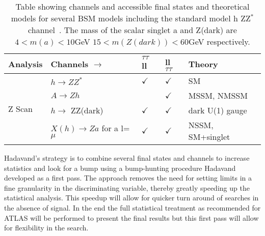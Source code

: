 \begin{table}[h]
\begin{center}
\begin{tabular}{ l |  l    |  l                   | l         || l    }  \hline 
 Analysis   & Channels        $\rightarrow$  &  $\tau \tau$ ll  & ll $\tau \tau$  &   Theory  \\ \hline \hline
\multirow{4}{*}{Z Scan} & $h\rightarrow ZZ^*$ &  $\checkmark$ & $\checkmark$                     & SM \\  

  &$A \rightarrow Zh$            &                    & $\checkmark$     &   MSSM, NMSSM \\  
  &$h \rightarrow$ ZZ(dark)  &    $ \checkmark$          & $\checkmark$  &dark U(1) gauge     \\   
  &$X(h) \rightarrow  Za$ for a l=$\mu$  &  $\checkmark$      & $\checkmark$ &   NSSM, SM+singlet\\ \hline \hline

    \hline
    \end{tabular}
    \caption{ Table showing channels and accessible final states and theoretical models for several BSM models including the standard model h \too ZZ$^*$ channel~\cite{hexotic}.  The mass of the scalar singlet a and Z(dark) are  $4  <m(a)< 10 $GeV   $15 < m(Z(dark)) < 60 $GeV respectively.}
\label{tab:anal}
\end{center}
\end{table}

Hadavand's strategy is to combine several final states and channels to increase statistics and look for a bump using a bump-hunting procedure Hadavand developed as a first pass. 
The approach removes the need for setting limits in a fine granularity in the discriminating variable, thereby greatly speeding up the statistical analysis. 
This speedup will allow for quicker turn around of searches in the absence of signal.  In the end the full statistical treatment as recommended for ATLAS will be performed to present the final 
results but this first pass will allow for flexibility in the search. 

